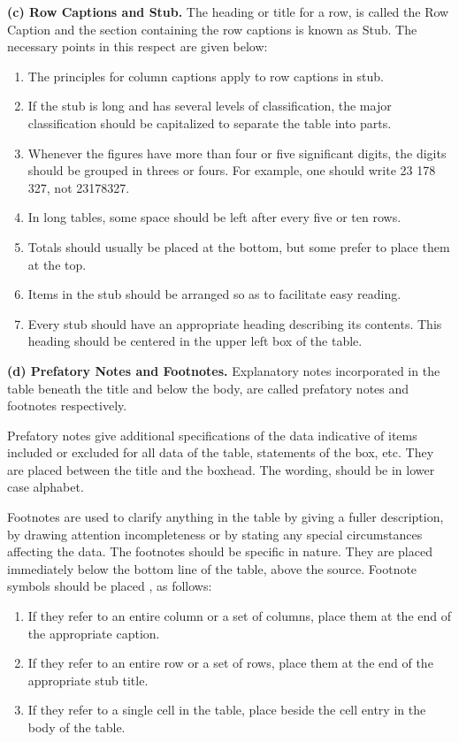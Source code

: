 \documentclass[]{article}
\begin{document}
\textbf{(c) Row Captions and Stub.} The heading or title for a row, is
called the Row Caption and the section containing the row captions is
known as Stub. The necessary points in this respect are given below:

\begin{enumerate}
\def\labelenumi{(\roman{enumi})}
\item
  The principles for column captions apply to row captions in stub.
\item
  If the stub is long and has several levels of classification, the
  major classification should be capitalized to separate the table into
  parts.
\item
  Whenever the figures have more than four or five significant digits,
  the digits should be grouped in threes or fours. For example, one
  should write 23 178 327, not 23178327.
\item
  In long tables, some space should be left after every five or ten
  rows.
\item
  Totals should usually be placed at the bottom, but some prefer to
  place them at the top.
\item
  Items in the stub should be arranged so as to facilitate easy reading.
\item
  Every stub should have an appropriate heading describing its contents.
  This heading should be centered in the upper left box of the table.
\end{enumerate}

\textbf{(d) Prefatory Notes and Footnotes.} Explanatory notes
incorporated in the table beneath the title and below the body, are
called prefatory notes and footnotes respectively.

Prefatory notes give additional specifications of the data indicative of
items included or excluded for all data of the table, statements of the
box, etc. They are placed between the title and the boxhead. The
wording, should be in lower case alphabet.

Footnotes are used to clarify anything in the table by giving a fuller
description, by drawing attention incompleteness or by stating any
special circumstances affecting the data. The footnotes should be
specific in nature. They are placed immediately below the bottom line of
the table, above the source. Footnote symbols should be placed , as
follows:

\begin{enumerate}
\def\labelenumi{(\roman{enumi})}
\item
  If they refer to an entire column or a set of columns, place them at
  the end of the appropriate caption.
\item
  If they refer to an entire row or a set of rows, place them at the end
  of the appropriate stub title.
\item
  If they refer to a single cell in the table, place beside the cell
  entry in the body of the table.
\end{enumerate}
\end{document}
